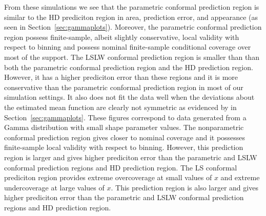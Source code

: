 \documentclass[11pt]{article}\usepackage[]{graphicx}\usepackage[]{color}
\begin{document}
From these simulations we see that the parametric conformal prediction region 
is similar to the HD prediciton region in area, prediction error, and 
appearance (as seen in Section~\ref{sec:gammaplots}).  Moreover, the 
parametric conformal prediction region possess finite-sample, albeit slightly 
conservative, local validity with respect to binning and possess nominal 
finite-sample conditional coverage over most of the support. 
The LSLW conformal prediction region is smaller than than both the parametric 
conformal prediction region and the HD prediction region.  However, it has a 
higher prediciton error than these regions and it is more conservative than 
the parametric conformal prediction region in most of our simulation 
settings.  It also does not fit the data well when the deviations about the 
estimated mean function are clearly not symmetric as evidenced by 
in Section~\ref{sec:gammaplots}.  These figures correspond to data generated 
from a Gamma distribution with small shape parameter values.  
The nonparametric conformal prediction region gives closer to nominal 
coverage and it possesses finite-sample local validity with respect to 
binning.  However, this prediction region is larger and gives higher 
prediciton error than the parametric and LSLW conformal prediction 
regions and HD prediction region.  The LS conformal prediciton region 
provides extreme overcoverage at small values of $x$ and extreme 
undercoverage at large values of $x$.  This prediction region is also larger 
and gives higher prediciton error than the parametric and LSLW conformal 
prediction regions and HD prediction region.
\end{document}
